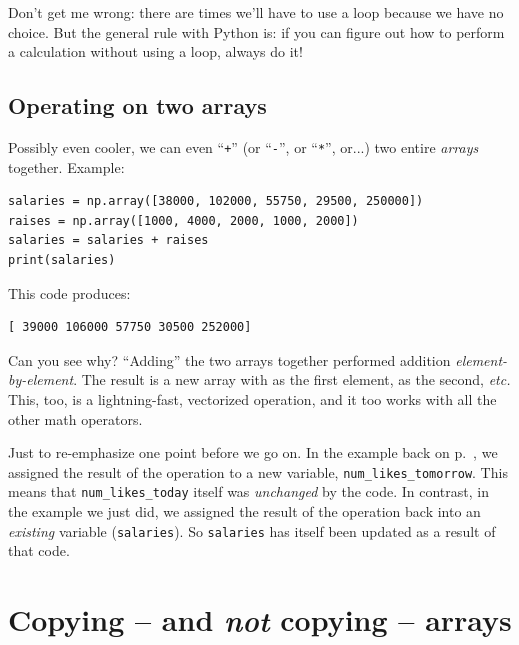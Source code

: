 Don't get me wrong: there are times we'll have to use a loop because we have no
choice. But the general rule with Python is: if you can figure out how to
perform a calculation without using a loop, always do it!


\subsection{Operating on two arrays}


Possibly even cooler, we can even ``\texttt{+}'' (or ``\texttt{-}'', or
``\texttt{*}'', or...) two entire \textit{arrays} together. Example:

\label{vectorizedArrayArrayExample}
\begin{Verbatim}[fontsize=\small,samepage=true,frame=single,framesep=3mm]
salaries = np.array([38000, 102000, 55750, 29500, 250000])
raises = np.array([1000, 4000, 2000, 1000, 2000])
salaries = salaries + raises
print(salaries)
\end{Verbatim}

This code produces:

\begin{Verbatim}[fontsize=\small,samepage=true,frame=leftline,framesep=5mm,framerule=1mm]
[ 39000 106000 57750 30500 252000]
\end{Verbatim}

Can you see why? ``Adding'' the two arrays together performed addition
\textit{element-by-element}. The result is a new array with  as the
first element,  as the second, \textit{etc.} This, too, is a
lightning-fast, vectorized operation, and it too works with all the other math
operators.

Just to re-emphasize one point before we go on. In the example back on
p.~\pageref{vectorizedArrayIntExample}, we assigned the result of the operation
to a new variable, \texttt{num\_likes\_tomorrow}. This means that
\texttt{num\_likes\_today} itself was \textit{unchanged} by the code. In
contrast, in the example we just did, we assigned the result of the operation
back into an \textit{existing} variable (\texttt{salaries}). So
\texttt{salaries} has itself been updated as a result of that code.



\section{Copying -- and \textit{not} copying -- arrays}

